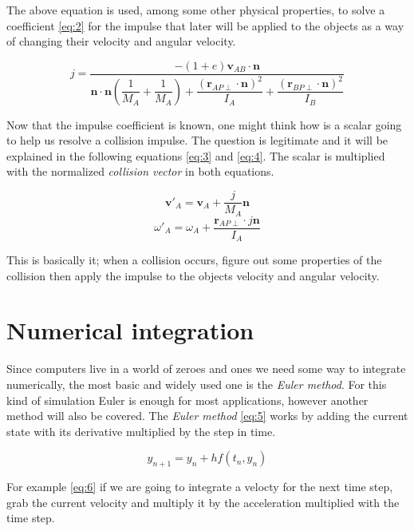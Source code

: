\documentclass[a4paper,12pt]{report}
\begin{document}
The above equation is used, among some other physical properties, to solve a coefficient \ref{eq:2} for the impulse that later will be applied to the objects as a way of changing their velocity and angular velocity.

\begin{equation}
j = \dfrac{ -(1+e) \mathbf v_{AB} \cdot \mathbf n }{
    \mathbf n \cdot \mathbf n ( \dfrac{1}{M_{A}} + \dfrac{1}{M_{A}} )
    + \dfrac{ (\mathbf r_{AP\perp} \cdot \mathbf n)^2}{I_{A} }
    + \dfrac{ (\mathbf r_{BP\perp} \cdot \mathbf n)^2}{I_{B} } }
\label{eq:2}
\end{equation}

Now that the impulse coefficient is known, one might think how is a scalar going to help us resolve a collision impulse. The question is legitimate and it will be explained in the following equations \ref{eq:3} and \ref{eq:4}. The scalar is multiplied with the normalized \emph{collision vector} in both equations.

\begin{equation}
\mathbf v'_{A}=\mathbf v_{A}+\dfrac{j}{M_{A}}\mathbf n
\label{eq:3}
\end{equation}
\begin{equation}
\omega'_{A}=\omega_{A}+\dfrac{\mathbf r_{AP\perp}\cdot j\mathbf n}{I_{A}}
\label{eq:4}
\end{equation}

This is basically it; when a collision occurs, figure out some properties of the collision then apply the impulse to the objects velocity and angular velocity.

\section{Numerical integration}

Since computers live in a world of zeroes and ones we need some way to integrate numerically, the most basic and widely used one is the \emph{Euler method}\cite{gdm}. For this kind of simulation Euler is enough for most applications, however another method will also be covered.
The \emph{Euler method} \ref{eq:5} works by adding the current state with its derivative multiplied by the step in time.

\begin{equation}
y_{n+1}=y_{n}+hf(t_n, y_n)
\label{eq:5}
\end{equation}

For example \ref{eq:6} if we are going to integrate a velocty for the next time step, grab the current velocity and multiply it by the acceleration multiplied with the time step.
\end{document}
